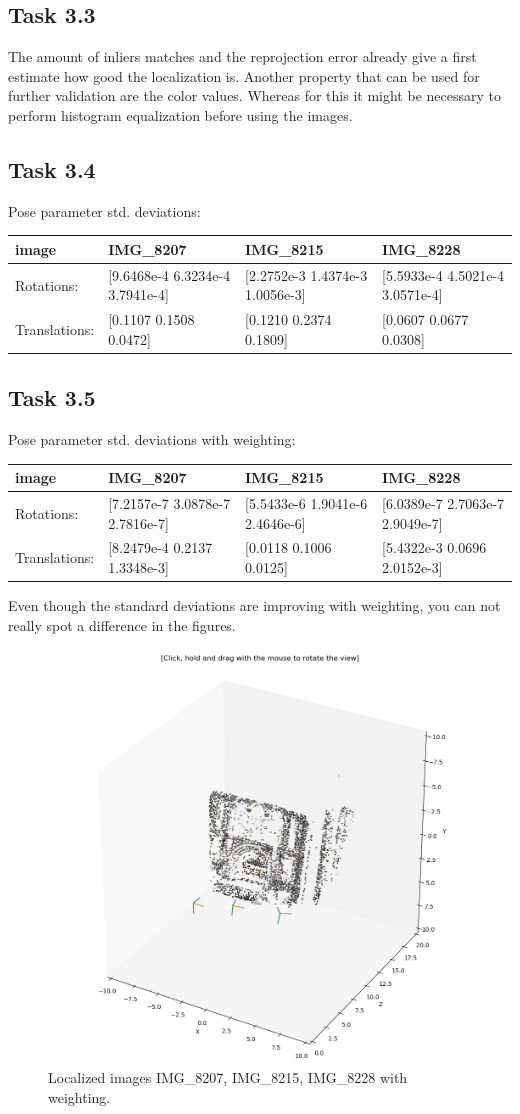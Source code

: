 \documentclass[a4paper]{article} %
\begin{document}
    \subsection*{Task 3.3}
    The amount of inliers matches and the reprojection error already give a first estimate how good the localization is.
    Another property that can be used for further validation are the color values.
    Whereas for this it might be necessary to perform histogram equalization before using the images.
    
    \subsection*{Task 3.4}
    Pose parameter std. deviations:\\
    \begin{tabular}{l|lll}
        image & IMG\_8207 & IMG\_8215 & IMG\_8228 \\
        \hline
        Rotations: & [9.6468e-4 6.3234e-4 3.7941e-4] & [2.2752e-3 1.4374e-3 1.0056e-3] & [5.5933e-4 4.5021e-4 3.0571e-4]\\
        Translations: & [0.1107 0.1508 0.0472] & [0.1210 0.2374 0.1809] & [0.0607 0.0677  0.0308]\\
    \end{tabular}

    \subsection*{Task 3.5}
    Pose parameter std. deviations with weighting:\\
    \begin{tabular}{l|lll}
        image & IMG\_8207 & IMG\_8215 & IMG\_8228 \\
        \hline
        Rotations: & [7.2157e-7 3.0878e-7 2.7816e-7] & [5.5433e-6 1.9041e-6 2.4646e-6]  & [6.0389e-7 2.7063e-7 2.9049e-7] \\
        Translations: & [8.2479e-4 0.2137  1.3348e-3] & [0.0118  0.1006 0.0125] & [5.4322e-3 0.0696 2.0152e-3]
    \end{tabular}

    Even though the standard deviations are improving with weighting, you can not really spot a difference in the figures.

    \begin{figure}[H]
        \centering
        \includegraphics[width= 0.7 \linewidth]{cams_weighted}
        \caption{Localized images IMG\_8207, IMG\_8215, IMG\_8228 with weighting.}
    \end{figure}
\end{document}
